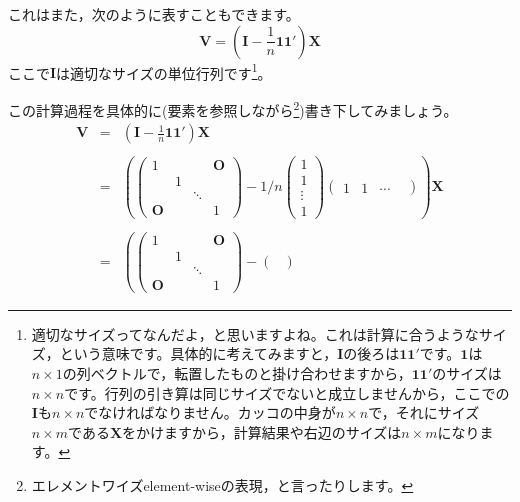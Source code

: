 \documentclass{ltjsbook}
\begin{document}
これはまた，次のように表すこともできます。
\[ \bm{V} = ( \bm{I} -\frac{1}{n}\bm{1} \bm{1} ')\bm{X} \]
ここで$\bm{I}$は適切なサイズの単位行列です\footnote{適切なサイズってなんだよ，と思いますよね。これは計算に合うようなサイズ，という意味です。具体的に考えてみますと，$\bm{I}$の後ろは$\bm{1}\bm{1}'$です。$\bm{1}$は$n\times 1$の列ベクトルで，転置したものと掛け合わせますから，$\bm{1}\bm{1}'$のサイズは$n \times n$です。行列の引き算は同じサイズでないと成立しませんから，ここでの$\bm{I}$も$n \times n$でなければなりません。カッコの中身が$n \times n$で，それにサイズ$n \times m$である$\bm{X}$をかけますから，計算結果や右辺のサイズは$n \times m$になります。}。

この計算過程を具体的に(要素を参照しながら\footnote{エレメントワイズelement-wiseの表現，と言ったりします。})書き下してみましょう。
\[
	\begin{array}{ccl}
		\bm{V} & = & (\bm{I} - \frac{1}{n}\bm{11}')\bm{X}        \\
		       &   &                                             \\
		       & = & \left( \begin{pmatrix}
				                    1      &   &        & \bm{O} \\
				                           & 1 &                 \\
				                           &   & \ddots &        \\
				                    \bm{O} &   &        & 1\end{pmatrix}
		-1/n
		\begin{pmatrix} 1 \\ 1 \\ \vdots \\ 1 \end{pmatrix}
		\begin{pmatrix} 1 & 1 & \cdots & \end{pmatrix}
		\right) \bm{X}                                           \\
		       &   &                                             \\
		       & = &
		\left(
		\begin{pmatrix}
				1      &   &        & \bm{O} \\
				       & 1 &                 \\
				       &   & \ddots &        \\
				\bm{O} &   &        & 1\end{pmatrix}
		-
		\begin{pmatrix}

\end{pmatrix}
\end{array}\]
\end{document}
